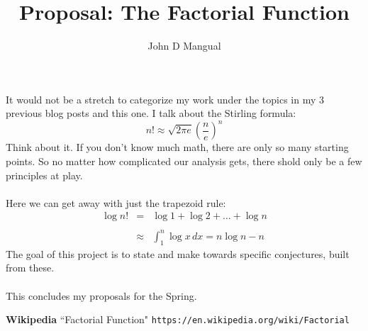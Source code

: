 \documentclass[12pt]{article}
\title{\textbf{Proposal: The Factorial Function}}
\author{John D Mangual}
\date{}
\begin{document}
\selectfont \fontsize{20}{25}\selectfont

\maketitle

\noindent It would not be a stretch to categorize my work under the topics in my 3 previous blog posts and this one.  I talk about the Stirling formula:
$$ n! \approx \sqrt{2 \pi e } \left( \frac{n}{e} \right)^n $$
Think about it.  If you don't know much math, there are only so many starting points.  So no matter how complicated our analysis gets, there shold only be a few principles at play. \\ \\
Here we can get away with just the trapezoid rule:
\begin{eqnarray*} \log n! &=& \log 1 + \log 2 + \dots + \log n \\ \\
& \approx &
\int_1^n \log x \, dx = n \log n - n \end{eqnarray*}
The goal of this project is to state and make towards specific conjectures, built from these. \\ \\
This concludes my proposals for the Spring.

\newpage


\newpage



\selectfont \fontsize{12}{10}\selectfont

\begin{thebibliography}{}

\item \textbf{Wikipedia} ``Factorial Function" \texttt{https://en.wikipedia.org/wiki/Factorial}

\end{thebibliography}
\end{document}

